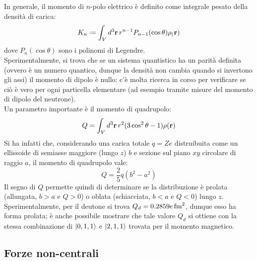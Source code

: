 In generale, il momento di $ n $-polo elettrico è definito come integrale pesato della densità di carica:
\begin{equation}
	K_n \defeq \int_V d^3\ve{r} \, r^{n-1} P_{n-1}(\cos \theta) \rho_(\ve{r})
	\label{eq:4.16}
\end{equation}
dove $ P_n(\cos \theta) $ sono i polinomi di Legendre.\\
Sperimentalmente, si trova che se un sistema quantistico ha un parità definita (ovvero è un numero quantico, dunque la densità non cambia quando si invertono gli assi) il momento di dipolo è nullo: c'è molta ricerca in corso per verificare se ciò è vero per ogni particella elementare (ad esempio tramite misure del momento di dipolo del neutrone).\\
Un parametro importante è il momento di quadrupolo:
\begin{equation}
	Q = \int_V d^3\mathbf{r} \, r^2 (3\cos^2 \theta - 1) \rho(\mathbf{r})
	\label{eq:4.17}
\end{equation}
Si ha infatti che, considerando una carica totale $ q = Ze $ distruibuita come un ellissoide di semiasse maggiore (lungo $ z $) $ b $ e sezione sul piano $ xy $ circolare di raggio $ a $, il momento di quadrupolo vale:
\begin{equation}
	Q = \frac{2}{5} q (b^2 - a^2)
	\label{eq:4.18}
\end{equation}
Il segno di $ Q $ permette quindi di determinare se la distribuzione è prolata (allungata, $ b > a $ e $ Q > 0 $) o oblata (schiacciata, $ b < a $ e $ Q < 0 $) lungo $ z $. Sperimentalmente, per il deutone si trova $ Q_d = 0.2859 e\,\mathrm{fm}^2 $, dunque esso ha forma prolata; è anche possibile mostrare che tale valore $ Q_d $ si ottiene con la stessa combinazione di $ \ket{0,1,1} $ e $ \ket{2,1,1} $ trovata per il momento magnetico.

\subsection{Forze non-centrali}

